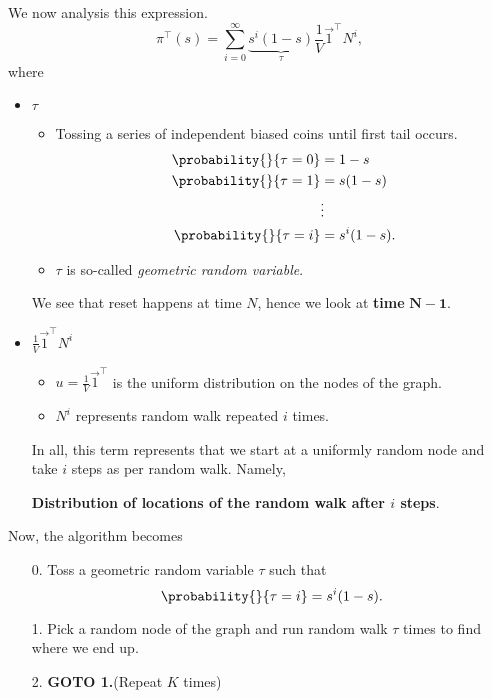 We now analysis this expression.
\[
	\pi^{\top}(s) = \sum\limits_{i=0}^{\infty} \underbrace{s^i (1 - s)}_{\tau}\frac{1}{V}\vec{1}^{\top}N^i,
\]
where
\begin{itemize}
	\item \(\tau\)
	      \begin{itemize}
		      \item Tossing a series of independent biased coins until first tail occurs.
		            \[
			            \begin{split}
				            \probability{}{\tau = 0} &= 1 - s\\
				            \probability{}{\tau = 1} &= s(1 - s)\\
				            &\vdots\\
				            \probability{}{\tau = i} &= s^i(1 - s).
			            \end{split}
		            \]
		      \item \(\tau\) is so-called \emph{geometric random variable}.
	      \end{itemize}
	      We see that reset happens at time \(N\), hence we look at \textbf{time} \(\bm{N-1}\).
	\item \(\frac{1}{V}\vec{1}^{\top}N^i\)
	      \begin{itemize}
		      \item \(u = \frac{1}{V}\vec{1}^{\top}\) is the uniform distribution on the nodes of the graph.
		      \item \(N^i\) represents random walk repeated \(i\) times.
	      \end{itemize}
	      In all, this term represents that we start at a uniformly random node and take \(i\) steps as per random walk. Namely,
	      \begin{center}
		      \textbf{Distribution of locations of the random walk after \(i\) steps}.
	      \end{center}
\end{itemize}

\hr

Now, the algorithm becomes
\begin{enumerate}
	\item[0.] Toss a geometric random variable \(\tau\) such that
		\[
			\probability{}{\tau = i} = s^i(1 - s).
		\]
	\item[1.] Pick a random node of the graph and run random walk \(\tau\) times to find where we end up.
	\item[2.] \textbf{GOTO 1.}(Repeat \(K\) times)
\end{enumerate}

